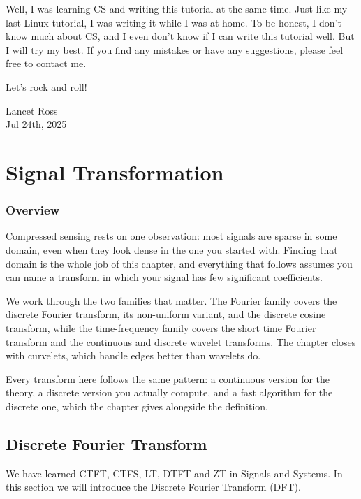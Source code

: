\documentclass[10pt,a4paper,oneside,numbers=noenddot]{scrbook}
\theoremstyle{ctplain}
\theoremstyle{ctresult}
\begin{document}
Well, I was learning CS and writing this tutorial at the same time. Just like my last Linux
tutorial, I was writing it while I was at home. To be honest, I don't know much about CS,
and I even don't know if I can write this tutorial well. But I will try my best. If you find
any mistakes or have any suggestions, please feel free to contact me.

Let's rock and roll!

\begin{flushright}
  Lancet Ross\\
  Jul 24th, 2025
\end{flushright}


\linespread{1.2}\selectfont

\mainmatter

\chapter{Signal Transformation}

\subsection*{Overview}

Compressed sensing rests on one observation: most signals are sparse in some domain, even
when they look dense in the one you started with. Finding that domain is the whole job of
this chapter, and everything that follows assumes you can name a transform in which your
signal has few significant coefficients.

We work through the two families that matter. The Fourier family covers the discrete
Fourier transform, its non-uniform variant, and the discrete cosine transform, while the
time-frequency family covers the short time Fourier transform and the continuous and
discrete wavelet transforms. The chapter closes with curvelets, which handle edges better
than wavelets do.

Every transform here follows the same pattern: a continuous version for the theory, a
discrete version you actually compute, and a fast algorithm for the discrete one, which
the chapter gives alongside the definition.


\section{Discrete Fourier Transform}

We have learned CTFT, CTFS, LT, DTFT and ZT in Signals and Systems. In this section
we will introduce the Discrete Fourier Transform (DFT).
\end{document}
